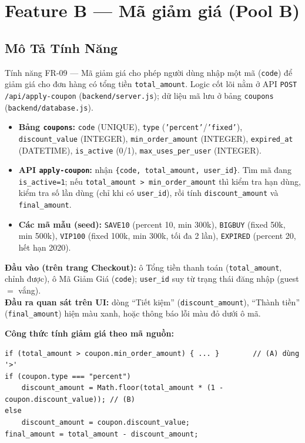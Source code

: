 \documentclass[12pt, a4paper]{report}
\begin{document}
\chapter{Feature B — Mã giảm giá (Pool B)}

\section{Mô Tả Tính Năng}
Tính năng FR-09 — Mã giảm giá cho phép người dùng nhập một mã (\texttt{code})
để giảm giá cho đơn hàng có tổng tiền \texttt{total\_amount}. Logic cốt lõi nằm ở API
\texttt{POST /api/apply-coupon} (\texttt{backend/server.js}); dữ liệu mã lưu ở bảng
\texttt{coupons} (\texttt{backend/database.js}).

\begin{itemize}
    \item \textbf{Bảng \texttt{coupons}:} \texttt{code} (UNIQUE), \texttt{type}
    (\texttt{'percent'}/\texttt{'fixed'}), \texttt{discount\_value} (INTEGER),
    \texttt{min\_order\_amount} (INTEGER), \texttt{expired\_at} (DATETIME),
    \texttt{is\_active} (0/1), \texttt{max\_uses\_per\_user} (INTEGER).
    \item \textbf{API \texttt{apply-coupon}:} nhận \verb|{code, total_amount, user_id}|.
    Tìm mã đang \texttt{is\_active=1}; nếu \texttt{total\_amount > min\_order\_amount} thì
    kiểm tra hạn dùng, kiểm tra số lần dùng (chỉ khi có \texttt{user\_id}), rồi tính
    \texttt{discount\_amount} và \texttt{final\_amount}.
    \item \textbf{Các mã mẫu (seed):} \texttt{SAVE10} (percent 10, min 300k),
    \texttt{BIGBUY} (fixed 50k, min 500k), \texttt{VIP100} (fixed 100k, min 300k, tối đa 2 lần),
    \texttt{EXPIRED} (percent 20, hết hạn 2020).
\end{itemize}

\noindent\textbf{Đầu vào (trên trang Checkout):} ô Tổng tiền thanh toán
(\texttt{total\_amount}, chỉnh được), ô Mã Giảm Giá (\texttt{code}); \texttt{user\_id}
suy từ trạng thái đăng nhập (guest $=$ vắng).\\
\textbf{Đầu ra quan sát trên UI:} dòng ``Tiết kiệm'' (\texttt{discount\_amount}), ``Thành tiền''
(\texttt{final\_amount}) hiện màu xanh, hoặc thông báo lỗi màu đỏ dưới ô mã.

\vspace{4pt}
\noindent\textbf{Công thức tính giảm giá theo mã nguồn:}
\begin{lstlisting}[caption={Tính discount trong apply-coupon (server.js)},numbers=none]
if (total_amount > coupon.min_order_amount) { ... }        // (A) dùng '>'
if (coupon.type === "percent")
    discount_amount = Math.floor(total_amount * (1 - coupon.discount_value)); // (B)
else
    discount_amount = coupon.discount_value;
final_amount = total_amount - discount_amount;
\end{lstlisting}
\end{document}

